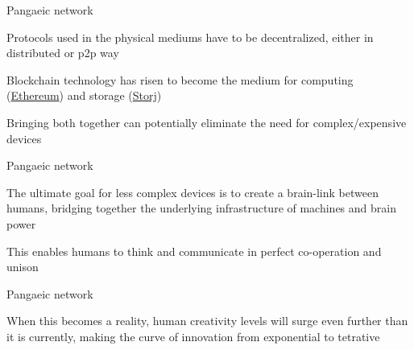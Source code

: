 \documentclass[14pt]{beamer}
\begin{document}
\begin{frame}{Pangaeic network}
 \begin{fullpageitemize}
\item 
	\begin{center}
Protocols used in the physical mediums have to be decentralized, either in distributed or p2p way
    \end{center}
\item 
	\begin{center}
Blockchain technology has risen to become the medium for computing (\href{https://www.ethereum.org/}{Ethereum}) and storage (\href{https://storj.io/}{Storj})
    \end{center}
\item 
	\begin{center}
Bringing both together can potentially eliminate the need for complex/expensive devices
    \end{center}

 \end{fullpageitemize}
\end{frame}

\begin{frame}{Pangaeic network}
 \begin{fullpageitemize}
\item 
	\begin{center}
The ultimate goal for less complex devices is to create a brain-link between humans, bridging together the underlying infrastructure of machines and brain power
    \end{center}
\item 
	\begin{center}
This enables humans to think and communicate in perfect co-operation and unison
    \end{center}

 \end{fullpageitemize}
\end{frame}

\begin{frame}{Pangaeic network}
 \begin{fullpageitemize}
\item 
	\begin{center}
When this becomes a reality, human creativity levels will surge even further than it is currently, making the curve of innovation from exponential to tetrative
    \end{center}
 \end{fullpageitemize}
\end{frame}
\end{document}
